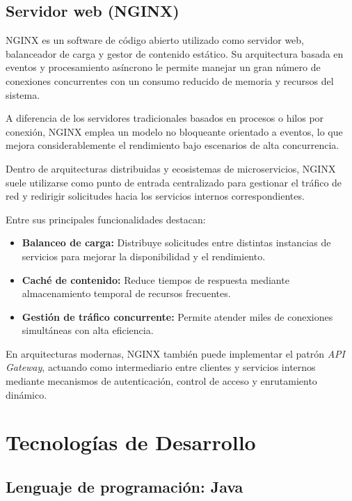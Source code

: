 \subsection{Servidor web (NGINX)}

NGINX es un software de código abierto utilizado como servidor web, balanceador de carga y gestor de contenido estático. Su arquitectura basada en eventos y procesamiento asíncrono le permite manejar un gran número de conexiones concurrentes con un consumo reducido de memoria y recursos del sistema.

A diferencia de los servidores tradicionales basados en procesos o hilos por conexión, NGINX emplea un modelo no bloqueante orientado a eventos, lo que mejora considerablemente el rendimiento bajo escenarios de alta concurrencia.

Dentro de arquitecturas distribuidas y ecosistemas de microservicios, NGINX suele utilizarse como punto de entrada centralizado para gestionar el tráfico de red y redirigir solicitudes hacia los servicios internos correspondientes.

Entre sus principales funcionalidades destacan:

\begin{itemize}

\item \textbf{Balanceo de carga:} Distribuye solicitudes entre distintas instancias de servicios para mejorar la disponibilidad y el rendimiento.

\item \textbf{Caché de contenido:} Reduce tiempos de respuesta mediante almacenamiento temporal de recursos frecuentes.

\item \textbf{Gestión de tráfico concurrente:} Permite atender miles de conexiones simultáneas con alta eficiencia.
\end{itemize}

En arquitecturas modernas, NGINX también puede implementar el patrón \textit{API Gateway}, actuando como intermediario entre clientes y servicios internos mediante mecanismos de autenticación, control de acceso y enrutamiento dinámico.

\section{Tecnologías de Desarrollo}

\subsection{Lenguaje de programación: Java}

